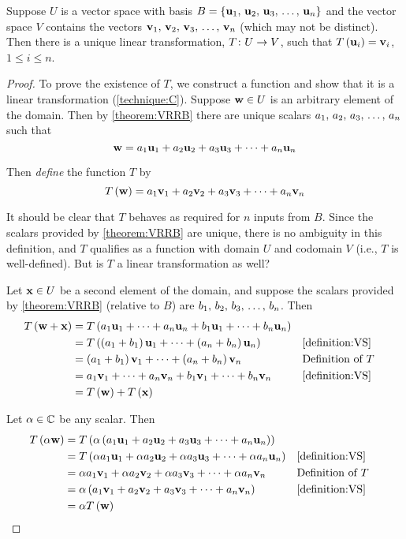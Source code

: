 \documentclass{ximera}
\begin{document}
\begin{theorem}
\label{theorem:LTDB}

Suppose $U$ is a vector space with basis $B=\left\{\mathbf{u}_{1},\,\mathbf{u}_{2},\,\mathbf{u}_{3},\,\ldots,\,\mathbf{u}_{n}\right\}$ and the vector space $V$ contains the vectors $\mathbf{v}_{1},\,\mathbf{v}_{2},\,\mathbf{v}_{3},\,\ldots,\,\mathbf{v}_{n}$ (which may not be distinct).   Then there is a unique linear transformation, $T\colon U\rightarrow V$, such that $T\left(\mathbf{u}_i\right)=\mathbf{v}_i$, $1\leq i\leq n$.


\begin{proof}
To prove the existence of $T$, we construct a function and show that it is a linear transformation (\ref{technique:C}).  Suppose $\mathbf{w}\in U$ is an arbitrary element of the domain.  Then by \ref{theorem:VRRB} there are unique scalars ${a}_{1},\,{a}_{2},\,{a}_{3},\,\ldots,\,{a}_{n}$ such that
\[
\mathbf{w}=a_{1}\mathbf{u}_{1}+a_{2}\mathbf{u}_{2}+a_{3}\mathbf{u}_{3}+\cdots +a_{n}\mathbf{u}_{n}
\]

Then \textit{define} the function $T$ by
\[
T\left(\mathbf{w}\right)=a_{1}\mathbf{v}_{1}+a_{2}\mathbf{v}_{2}+a_{3}\mathbf{v}_{3}+\cdots +a_{n}\mathbf{v}_{n}
\]

It should be clear that $T$ behaves as required for $n$ inputs from $B$.  Since the scalars provided by \ref{theorem:VRRB} are unique, there is no ambiguity in this definition, and $T$ qualifies as a function with domain $U$ and codomain $V$ (i.e.,  $T$ is well-defined).  But is $T$ a linear transformation as well?

Let $\mathbf{x}\in U$ be a second element of the domain, and suppose the scalars provided by \ref{theorem:VRRB} (relative to $B$) are ${b}_{1},\,{b}_{2},\,{b}_{3},\,\ldots,\,{b}_{n}$.  Then
\begin{align*}
T\left(\mathbf{w}+\mathbf{x}\right)&=
T\left(
a_1\mathbf{u}_1+
\cdots+
a_n\mathbf{u}_n+
b_1\mathbf{u}_1+
\cdots+
b_n\mathbf{u}_n
\right)\\
&=
T\left(
\left(a_1+b_1\right)\mathbf{u}_1+
\cdots+
\left(a_n+b_n\right)\mathbf{u}_n
\right)
&&\ref{definition:VS}\\
&=
\left(a_1+b_1\right)\mathbf{v}_1+
\cdots+
\left(a_n+b_n\right)\mathbf{v}_n
&&\text{Definition of $T$}\\
&=
a_1\mathbf{v}_1+
\cdots+
a_n\mathbf{v}_n+
b_1\mathbf{v}_1+
\cdots+
b_n\mathbf{v}_n
&&\ref{definition:VS}\\
&=T\left(\mathbf{w}\right)+T\left(\mathbf{x}\right)
\end{align*}

Let $\alpha\in\mathbb{C}$ be any scalar.  Then
\begin{align*}
T\left(\alpha\mathbf{w}\right)&=
T\left(\alpha\left(a_{1}\mathbf{u}_{1}+a_{2}\mathbf{u}_{2}+a_{3}\mathbf{u}_{3}+\cdots +a_{n}\mathbf{u}_{n}\right)\right)\\
&=
T\left(\alpha a_{1}\mathbf{u}_{1}+\alpha a_{2}\mathbf{u}_{2}+\alpha a_{3}\mathbf{u}_{3}+\cdots +\alpha a_{n}\mathbf{u}_{n}\right)
&&\ref{definition:VS}\\
&=\alpha a_{1}\mathbf{v}_{1}+\alpha a_{2}\mathbf{v}_{2}+\alpha a_{3}\mathbf{v}_{3}+\cdots +\alpha a_{n}\mathbf{v}_{n}
&&\text{Definition of $T$}\\
&=\alpha\left(a_{1}\mathbf{v}_{1}+a_{2}\mathbf{v}_{2}+a_{3}\mathbf{v}_{3}+\cdots +a_{n}\mathbf{v}_{n}\right)
&&\ref{definition:VS}\\
&=\alpha T\left(\mathbf{w}\right)
\end{align*}


\end{proof}
\end{theorem}
\end{document}
